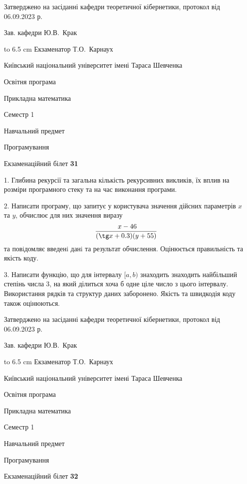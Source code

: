 \documentclass[12pt, ukrainian]{article}
\begin{document}
{\smallskip\smallskip \begin {scriptsize} Затверджено на засіданні кафедри теоретичної кібернетики, протокол   від   06.09.2023 р.\par\smallskip\smallskip\smallskip\smallskip
{\parbox {6.5 cm} {Зав. кафедри \dotfill Ю.В.~Крак}}\hspace {0.7cm} {\hbox to 6.5 cm { Екзаменатор \dotfill Т.О.~Карнаух}} \end{scriptsize}}
\newpage
{{\begin {scriptsize}\par
{ \center  Київський національний університет імені Тараса Шевченка \par}
{\parbox {5 cm}{Освітня програма \hfill}{\parbox {7 cm}{Прикладна математика\hfill}}\parbox {6 cm}{\hfill Семестр 1}}\par
{\parbox {5 cm} {Навчальний предмет \hfill}\parbox {7 cm}{Програмування \hfill}\parbox {6cm}{\hfill}\par}\vspace{-15pt} \end{scriptsize}}{\center Екзаменаційний білет \No \textbf { 31 }\par}}
{%
1. Глибина рекурсії та загальна кількість рекурсивних викликів, їх вплив на розміри програмного стеку та на час виконання програми.%
\par
2. Написати програму, що запитує у користувача значення дійсних параметрів $x$ та $y$, обчислює для них значення виразу 
$$\frac{\ x - 46}{(\tg x + 0.3) (y + 55)}$$ 
та повiдомляє введенi данi та результат обчислення.
 Оцінюється правильність та якість коду.

\par
3. Написати функцію, що для інтервалу $[a, b)$ знаходить знаходить найбільший степінь числа 3, на який ділиться хоча б одне ціле число з цього інтервалу.  Використання рядків та структур даних заборонено. Якість та швидкодія коду також оцінюються. 

}
{\smallskip\smallskip \begin {scriptsize} Затверджено на засіданні кафедри теоретичної кібернетики, протокол   від   06.09.2023 р.\par\smallskip\smallskip\smallskip\smallskip
{\parbox {6.5 cm} {Зав. кафедри \dotfill Ю.В.~Крак}}\hspace {0.7cm} {\hbox to 6.5 cm { Екзаменатор \dotfill Т.О.~Карнаух}} \end{scriptsize}}
\vspace{0.9cm}
{{\begin {scriptsize}\par
{ \center  Київський національний університет імені Тараса Шевченка \par}
{\parbox {5 cm}{Освітня програма \hfill}{\parbox {7 cm}{Прикладна математика\hfill}}\parbox {6 cm}{\hfill Семестр 1}}\par
{\parbox {5 cm} {Навчальний предмет \hfill}\parbox {7 cm}{Програмування \hfill}\parbox {6cm}{\hfill}\par}\vspace{-15pt} \end{scriptsize}}{\center Екзаменаційний білет \No \textbf { 32 }\par}}
\end{document}
